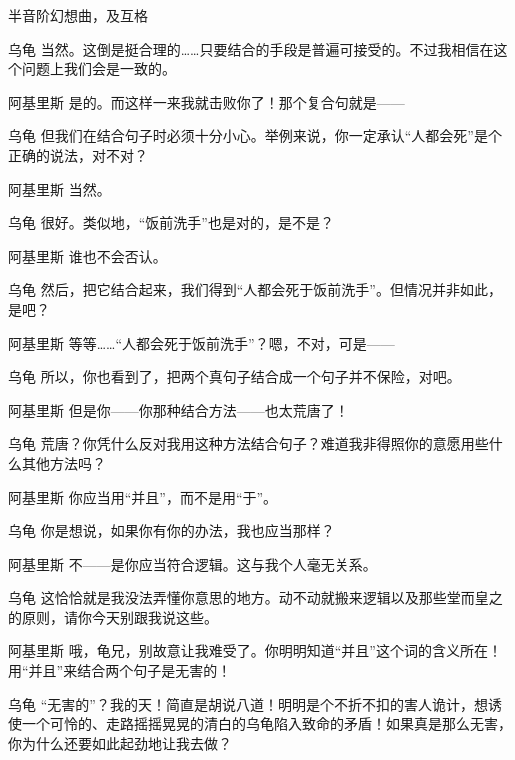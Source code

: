\begin{dialog}{半音阶幻想曲，及互格}
\begin{dialogue}
\item[乌龟]当然。这倒是挺合理的……只要结合的手段是普遍可接受的。不过我相信在这个问题上我们会是一致的。

\item[阿基里斯]是的。而这样一来我就击败你了！那个复合句就是——

\item[乌龟]但我们在结合句子时必须十分小心。举例来说，你一定承认“人都会死”是个正确的说法，对不对？

\item[阿基里斯]当然。

\item[乌龟]很好。类似地，“饭前洗手”也是对的，是不是？

\item[阿基里斯]谁也不会否认。

\item[乌龟]然后，把它结合起来，我们得到“人都会死于饭前洗手”。但情况并非如此，是吧？

\item[阿基里斯]等等……“人都会死于饭前洗手”？嗯，不对，可是——

\item[乌龟]所以，你也看到了，把两个真句子结合成一个句子并不保险，对吧。

\item[阿基里斯]但是你——你那种结合方法——也太荒唐了！

\item[乌龟]荒唐？你凭什么反对我用这种方法结合句子？难道我非得照你的意愿用些什么其他方法吗？

\item[阿基里斯]你应当用“并且”，而不是用“于”。

\item[乌龟]你是想说，如果你有你的办法，我也应当那样？

\item[阿基里斯]不——是你应当符合逻辑。这与我个人毫无关系。

\item[乌龟]这恰恰就是我没法弄懂你意思的地方。动不动就搬来逻辑以及那些堂而皇之的原则，请你今天别跟我说这些。

\item[阿基里斯]哦，龟兄，别故意让我难受了。你明明知道“并且”这个词的含义所在！用“并且”来结合两个句子是无害的！

\item[乌龟]“无害的”？我的天！简直是胡说八道！明明是个不折不扣的害人诡计，想诱使一个可怜的、走路摇摇晃晃的清白的乌龟陷入致命的矛盾！如果真是那么无害，你为什么还要如此起劲地让我去做？


\end{dialogue}
\end{dialog}
